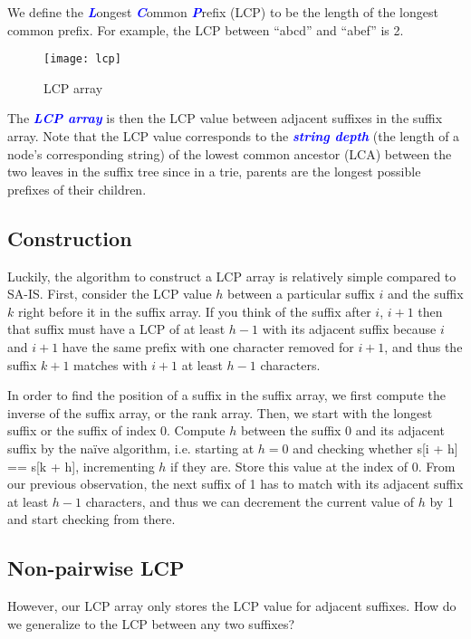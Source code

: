 \documentclass[11pt, oneside]{article}
\newcommand{\emphasis}[1]{\textcolor{blue}{\textbf{\textit{#1}}}}
\begin{document}
We define the \emphasis{L}ongest \emphasis{C}ommon \emphasis{P}refix (LCP)
to be the length of the longest common prefix.
For example, the LCP between ``abcd'' and ``abef'' is 2.

\begin{figure}[h!]
\centering
\texttt{[image: lcp]}
\caption{LCP array}
\end{figure}

The \emphasis{LCP array} is then the LCP value between adjacent suffixes in the suffix array.
Note that the LCP value corresponds to the \emphasis{string depth}
(the length of a node's corresponding string)
of the lowest common ancestor (LCA) between the two leaves in the suffix tree
since in a trie, parents are the longest possible prefixes of their children.

\subsection{Construction}

Luckily, the algorithm to construct a LCP array is relatively simple compared to SA-IS.
First, consider the LCP value \( h \) between a particular suffix \( i \)
and the suffix \( k \) right before it in the suffix array.
If you think of the suffix after \( i \), \( i + 1 \) then that suffix must
have a LCP of at least \( h - 1 \) with its adjacent suffix because \( i \) and \( i + 1 \)
have the same prefix with one character removed for \( i + 1 \), and thus the
suffix \( k + 1 \) matches with \( i + 1 \) at least \( h - 1 \) characters.

In order to find the position of a suffix in the suffix array, we first compute
the inverse of the suffix array, or the rank array.
Then, we start with the longest suffix or the suffix of index 0.
Compute \( h \) between the suffix 0 and its adjacent suffix by the naïve algorithm,
i.e. starting at \( h = 0 \) and checking whether s[i + h] == s[k + h], incrementing \( h \) if they are.
Store this value at the index of 0.
From our previous observation, the next suffix of 1 has to match with its adjacent suffix
at least \( h - 1 \) characters, and thus we can decrement the current value of \( h \)
by 1 and start checking from there.

\subsection{Non-pairwise LCP}

However, our LCP array only stores the LCP value for adjacent suffixes.
How do we generalize to the LCP between any two suffixes?
\end{document}
